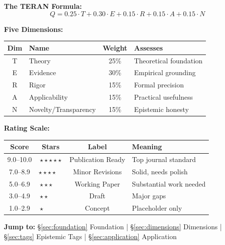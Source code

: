 \documentclass[11pt,a4paper]{article}
\begin{document}
\begin{tcolorbox}[colback=green!5,colframe=green!75!black,title=\textbf{Quick Reference}]

\textbf{The TERAN Formula:}
\begin{equation}
Q = 0.25 \cdot T + 0.30 \cdot E + 0.15 \cdot R + 0.15 \cdot A + 0.15 \cdot N
\end{equation}

\textbf{Five Dimensions:}
\begin{center}
\begin{tabular}{clcl}
\toprule
\textbf{Dim} & \textbf{Name} & \textbf{Weight} & \textbf{Assesses} \\
\midrule
T & Theory & 25\% & Theoretical foundation \\
E & Evidence & 30\% & Empirical grounding \\
R & Rigor & 15\% & Formal precision \\
A & Applicability & 15\% & Practical usefulness \\
N & Novelty/Transparency & 15\% & Epistemic honesty \\
\bottomrule
\end{tabular}
\end{center}

\textbf{Rating Scale:}
\begin{center}
\begin{tabular}{cccl}
\toprule
\textbf{Score} & \textbf{Stars} & \textbf{Label} & \textbf{Meaning} \\
\midrule
9.0--10.0 & $\star\star\star\star\star$ & Publication Ready & Top journal standard \\
7.0--8.9 & $\star\star\star\star\phantom{\star}$ & Minor Revisions & Solid, needs polish \\
5.0--6.9 & $\star\star\star\phantom{\star\star}$ & Working Paper & Substantial work needed \\
3.0--4.9 & $\star\star\phantom{\star\star\star}$ & Draft & Major gaps \\
1.0--2.9 & $\star\phantom{\star\star\star\star}$ & Concept & Placeholder only \\
\bottomrule
\end{tabular}
\end{center}

\textbf{Jump to:} §\ref{sec:foundation} Foundation | §\ref{sec:dimensions} Dimensions | §\ref{sec:tags} Epistemic Tags | §\ref{sec:application} Application
\end{tcolorbox}
\end{document}
